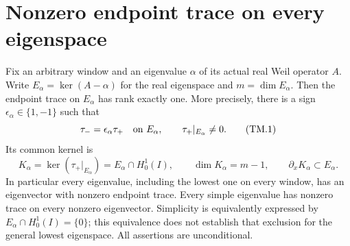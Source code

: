 \section{Nonzero endpoint trace on every eigenspace}
\label{sec:spectral-trace-multiplicity}

\begin{theorem}
\label{AC-S44}
Fix an arbitrary window and an eigenvalue \(\alpha\) of its
actual real Weil operator \(A\).  Write
\(E_\alpha=\ker(A-\alpha)\) for the real eigenspace and
\(m=\dim E_\alpha\).  Then the endpoint trace on \(E_\alpha\)
has rank exactly one.  More precisely, there is a sign
\(\epsilon_\alpha\in\{1,-1\}\) such that
\[
 \tau_-=\epsilon_\alpha\tau_+\quad\hbox{on }E_\alpha,
 \qquad \tau_+|_{E_\alpha}\ne0.                         \tag{TM.1}
\]
Its common kernel is
\[
 K_\alpha=\ker(\tau_+|_{E_\alpha})
          =E_\alpha\cap H^1_0(I),\qquad
 \dim K_\alpha=m-1,
 \qquad \partial_xK_\alpha\subset E_\alpha.              \tag{TM.2}
\]
In particular every eigenvalue, including the lowest one on
every window, has an eigenvector with nonzero endpoint trace.
Every simple eigenvalue has nonzero trace on every nonzero
eigenvector.  Simplicity is equivalently expressed by
\(E_\alpha\cap H^1_0(I)=\{0\}\); this equivalence does not
establish that exclusion for the general lowest eigenspace.
All assertions are unconditional.
\end{theorem}
